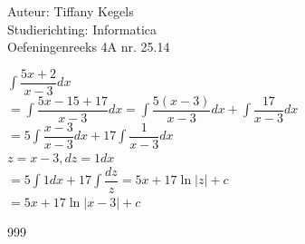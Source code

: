 \documentclass[a4paper]{article}
\begin{document}
  
\noindent \large Auteur: Tiffany Kegels \\
\noindent \large Studierichting: Informatica\\
\noindent \large Oefeningenreeks 4A nr. 25.14\\

\medskip

\normalsize

$\displaystyle\int \dfrac{5x + 2}{x-3} dx$\\

$= \displaystyle\int \dfrac{5x -15 + 17}{x-3} dx = \displaystyle\int \dfrac{5(x-3)}{x-3} dx + \displaystyle\int \dfrac{17}{x-3}dx$\\

$= 5 \displaystyle\int \dfrac{x-3}{x-3} dx +17 \displaystyle\int \dfrac{1}{x-3} dx$\\

$z = x-3 , dz = 1dx$\\

$= 5\displaystyle\int 1dx + 17 \displaystyle\int \dfrac{dz}{z} = 5x + 17 \ln |z| + c$\\

$= 5x + 17 \ln |x-3| + c$\\

\begin{thebibliography}{999}

\end{thebibliography}
\end{document}
